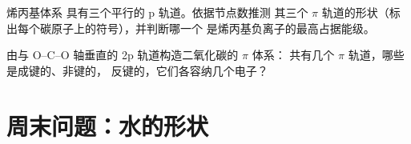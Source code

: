 \begin{exercise}[$\star\star\star$]\label{exo:b2:fragment-orbitals:11}
烯丙基体系  具有三个平行的 p 轨道。依据节点数推测
其三个 $\pi$ 轨道的形状（标出每个碳原子上的符号），并判断哪一个
是烯丙基负离子的最高占据能级。
\end{exercise}

\begin{exercise}[$\star\star\star$]\label{exo:b2:fragment-orbitals:12}
由与 O--C--O 轴垂直的 2p 轨道构造二氧化碳的 $\pi$ 体系：
共有几个 $\pi$ 轨道，哪些是成键的、非键的，
反键的，它们各容纳几个电子？
\end{exercise}

\section{周末问题：水的形状}

